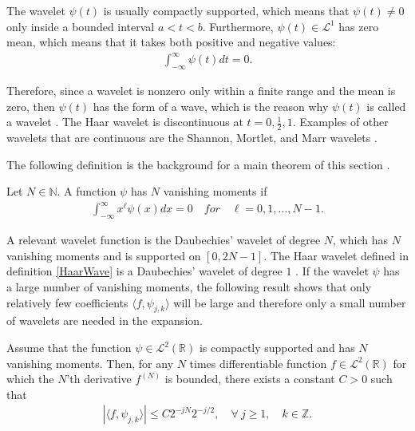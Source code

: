 The wavelet $\psi(t)$ is usually compactly supported, which means that $\psi(t) \neq 0$ only inside a bounded interval $a < t < b$. Furthermore, $\psi(t) \in \mathcal{L}^1$ has zero mean, which means that it takes both positive and negative values:
\begin{align*}
\int_{-\infty}^\infty \psi(t) dt = 0.
\end{align*}

Therefore, since a wavelet is nonzero only within a finite range and the mean is zero, then $\psi(t)$ has the form of a wave, which is the reason why $\psi(t)$ is called a wavelet \cite{page 411, Wang}. The Haar wavelet is discontinuous at $t = 0, \frac{1}{2}, 1$. Examples of other wavelets that are continuous are the Shannon, Mortlet, and Marr wavelets \cite{page 417-420, Wang}.

\newpage
The following definition is the background for a main theorem of this section \cite{page 170, FSE2010}.

\begin{definition}
Let $N \in \mathbb{N}$. A function $\psi$ has $N$ vanishing moments if
\begin{align*}
\int_{-\infty}^\infty x^\ell \psi(x) dx = 0 \quad for \quad \ell = 0, 1, \dots, N-1.
\end{align*}
\end{definition}

A relevant wavelet function is the Daubechies' wavelet of degree $N$, which has $N$ vanishing moments and is supported on $[0,2N-1]$. The Haar wavelet defined in definition \ref{HaarWave} is a Daubechies' wavelet of degree $1$ \cite{page 174, FSE2010}. If the wavelet $\psi$ has a large number of vanishing moments, the following result shows that only relatively few coefficients $\langle f, \psi_{j,k} \rangle$ will be large and therefore only a small number of wavelets are needed in the expansion.

\begin{theorem}
Assume that the function $\psi \in \mathcal{L}^2(\mathbb{R})$ is compactly supported and has $N$ vanishing moments. Then, for any $N$ times differentiable function $f \in \mathcal{L}^2(\mathbb{R})$ for which the $N$'th derivative $f^{(N)}$ is bounded, there exists a constant $C > 0$ such that
\begin{align} \label{eq:decay_wave_coeff}
|\langle f, \psi_{j,k} \rangle| \leq C 2^{-jN} 2^{-j/2}, \quad \forall \ j \geq 1, \quad k \in \mathbb{Z}.
\end{align}
\end{theorem}

